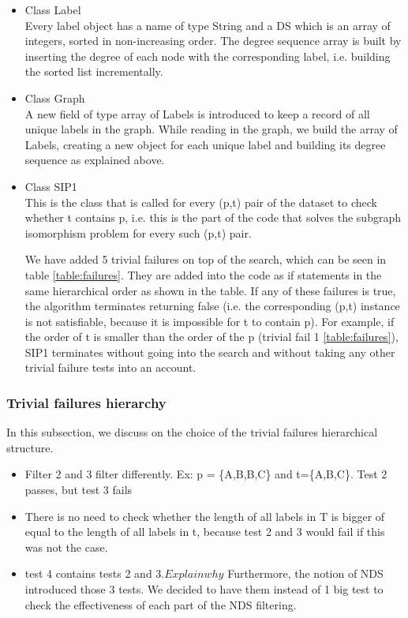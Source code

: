 \documentclass{l4proj}
\newcounter{example}[section]
\begin{document}
\begin{itemize}
\item Class Label\\
Every label object has a name of type String and a DS which is an array of integers, sorted in non-increasing order. The degree sequence array is built by inserting the degree of each node with the corresponding label, i.e. building the sorted list incrementally.
\item Class Graph\\
A new field of type array of Labels is introduced to keep a record of all unique labels in the graph. While reading in the graph, we build the array of Labels, creating a new object for each unique label and building its degree sequence as explained above.
\item Class SIP1\\
This is the class that is called for every (p,t) pair of the dataset to check whether t contains p, i.e. this is the part of the code that solves the subgraph isomorphism problem for every such (p,t) pair.

We have added 5 trivial failures on top of the search, which can be seen in table \ref{table:failures}. They are added into the code as if statements in the same hierarchical order as shown in the table. If any of these failures is true, the algorithm terminates returning false (i.e. the corresponding (p,t) instance is not satisfiable, because it is impossible for t to contain p). For example, if the order of t is smaller than the order of the p (trivial fail 1 \ref{table:failures}), SIP1 terminates without going into the search and without taking any other trivial failure tests into an account. 
\end{itemize}


\subsubsection{Trivial failures hierarchy}
In this subsection, we discuss on the choice of the trivial failures hierarchical structure.

\begin{itemize}
\item Filter 2 and 3 filter differently. Ex: p = \{A,B,B,C\} and t=\{A,B,C\}. Test 2 passes, but test 3 fails
\item There is no need to check whether the length of all labels in T is bigger of equal to the length of all labels in t, because test 2 and 3 would fail if this was not the case.
\item test 4 contains tests 2 and 3.$Explain why$ Furthermore, the notion of NDS introduced those 3 tests. We decided to have them instead of 1 big test to check the effectiveness of each part of the NDS filtering. 
\end{itemize}
\end{document}
